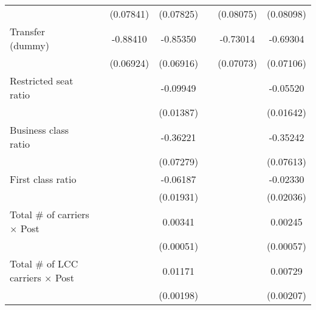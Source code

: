 \begin{table}[htbp]
\begin{tabular}{l*{6}{c}}
                    &                     &   (0.07841)         &   (0.07825)         &                     &   (0.08075)         &   (0.08098)         \\
\addlinespace
\shortstack{Transfer \\ (dummy)}&                     &    -0.88410\sym{***}&    -0.85350\sym{***}&                     &    -0.73014\sym{***}&    -0.69304\sym{***}\\
                    &                     &   (0.06924)         &   (0.06916)         &                     &   (0.07073)         &   (0.07106)         \\
\addlinespace
Restricted seat ratio&                     &                     &    -0.09949\sym{***}&                     &                     &    -0.05520\sym{***}\\
                    &                     &                     &   (0.01387)         &                     &                     &   (0.01642)         \\
\addlinespace
Business class ratio&                     &                     &    -0.36221\sym{***}&                     &                     &    -0.35242\sym{***}\\
                    &                     &                     &   (0.07279)         &                     &                     &   (0.07613)         \\
\addlinespace
First class ratio   &                     &                     &    -0.06187\sym{***}&                     &                     &    -0.02330         \\
                    &                     &                     &   (0.01931)         &                     &                     &   (0.02036)         \\
\addlinespace
Total # of carriers $\times$ Post&                     &                     &     0.00341\sym{***}&                     &                     &     0.00245\sym{***}\\
                    &                     &                     &   (0.00051)         &                     &                     &   (0.00057)         \\
\addlinespace
Total # of LCC carriers $\times$ Post&                     &                     &     0.01171\sym{***}&                     &                     &     0.00729\sym{***}\\
                    &                     &                     &   (0.00198)         &                     &                     &   (0.00207)         \\

\end{tabular}
\end{table}
